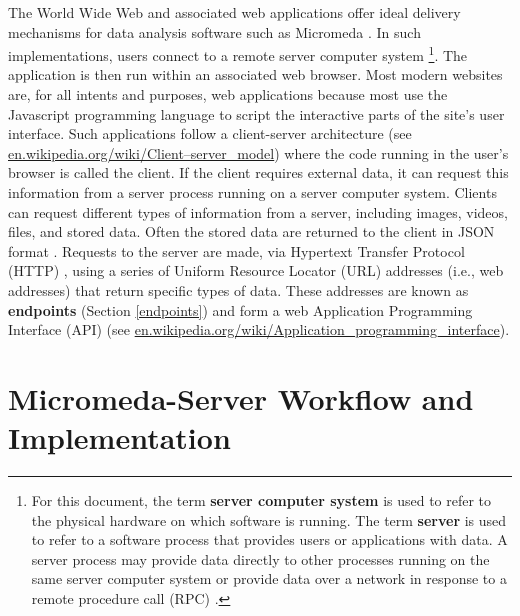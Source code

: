 The World Wide Web and associated web applications offer ideal delivery mechanisms for data analysis software such as Micromeda \cite{berners1994world}. In such implementations, users connect to a remote server computer system \footnote{For this document, the term \textbf{server computer system} is used to refer to the physical hardware on which software is running. The term \textbf{server} is used to refer to a software process that provides users or applications with data. A server process may provide data directly to other processes running on the same server computer system or provide data over a network in response to a remote procedure call (RPC) \cite{nelson1981remote}.}. The application is then run within an associated web browser. Most modern websites are, for all intents and purposes, web applications because most use the Javascript programming language \cite{flanagan2006javascript} to script the interactive parts of the site's user interface. Such applications follow a client-server architecture \cite{svobodova1985client} (see \href{en.wikipedia.org/wiki/Client–server\_model}{en.wikipedia.org/wiki/Client–server\_model}) where the code running in the user's browser is called the client. If the client requires external data, it can request this information from a server process running on a server computer system. Clients can request different types of information from a server, including images, videos, files, and stored data. Often the stored data are returned to the client in JSON format \cite{bray2014rfc}. Requests to the server are made, via Hypertext Transfer Protocol (HTTP) \cite{fielding1999hypertext}, using a series of Uniform Resource Locator (URL) addresses \cite{berners1994rfc} (i.e., web addresses) that return specific types of data. These addresses are known as \textbf{endpoints} (Section \ref{endpoints}) and form a web Application Programming Interface (API) (see \href{en.wikipedia.org/wiki/Application\_programming\_interface}{en.wikipedia.org/wiki/Application\_programming\_interface}).

\section{Micromeda-Server Workflow and Implementation} \label{server-workflow}

